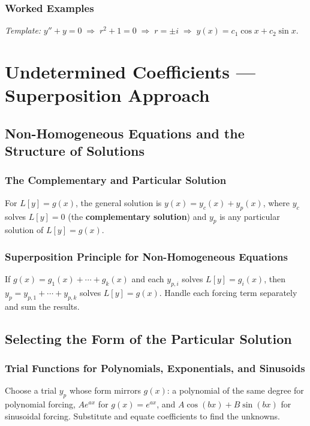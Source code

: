 \documentclass[10pt]{article}
\newcommand{\m}[1]{$#1$}
\newcommand{\annotspace}[1][3.5cm]{\vspace{#1}}
\begin{document}
    \subsubsection{Worked Examples}

    \textit{Template:} \quad
    \m{y'' + y = 0 \;\Rightarrow\; r^2 + 1 = 0 \;\Rightarrow\; r = \pm i
    \;\Rightarrow\; y(x) = c_1 \cos x + c_2 \sin x.}

    \annotspace[5cm]

\section{Undetermined Coefficients --- Superposition Approach}

\subsection{Non-Homogeneous Equations and the Structure of Solutions}

    \subsubsection{The Complementary and Particular Solution}
    For \m{L[y] = g(x)}, the general solution is \m{y(x) = y_c(x) + y_p(x)}, where \m{y_c} solves
    \m{L[y] = 0} (the \textbf{complementary solution}) and \m{y_p} is any particular solution of
    \m{L[y] = g(x)}.

    \subsubsection{Superposition Principle for Non-Homogeneous Equations}
    If \m{g(x) = g_1(x) + \cdots + g_k(x)} and each \m{y_{p,i}} solves \m{L[y] = g_i(x)}, then
    \m{y_p = y_{p,1} + \cdots + y_{p,k}} solves \m{L[y] = g(x)}.
    Handle each forcing term separately and sum the results.

\subsection{Selecting the Form of the Particular Solution}

    \subsubsection{Trial Functions for Polynomials, Exponentials, and Sinusoids}
    Choose a trial \m{y_p} whose form mirrors \m{g(x)}: a polynomial of the same degree for polynomial
    forcing, \m{A e^{ax}} for \m{g(x) = e^{ax}}, and \m{A\cos(bx) + B\sin(bx)} for sinusoidal
    forcing. Substitute and equate coefficients to find the unknowns.
\end{document}
